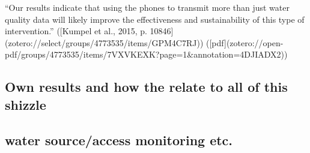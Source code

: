 “Our results indicate that using the phones to transmit more than just water quality data will likely improve the effectiveness and sustainability of this type of intervention.” ([Kumpel et al., 2015, p. 10846](zotero://select/groups/4773535/items/GPM4C7RJ)) ([pdf](zotero://open-pdf/groups/4773535/items/7VXVKEXK?page=1&annotation=4DJIADX2))
\subsection{Own results and how the relate to all of this shizzle}








\subsection{water source/access monitoring etc.}


